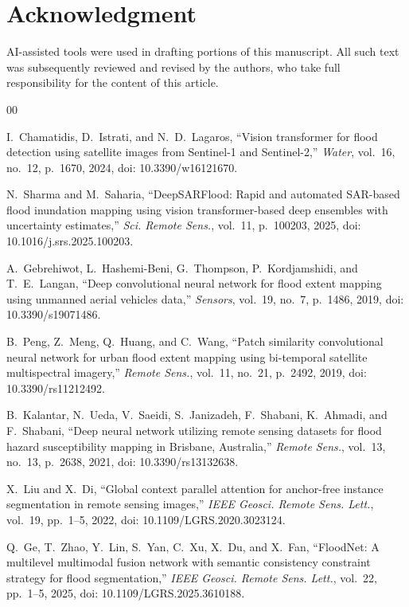 \section*{Acknowledgment}

AI-assisted tools were used in drafting portions of this manuscript. All such
text was subsequently reviewed and revised by the authors, who take full
responsibility for the content of this article.

\begin{thebibliography}{00}

 I.~Chamatidis, D.~Istrati, and N.~D.~Lagaros, ``Vision transformer
for flood detection using satellite images from Sentinel-1 and Sentinel-2,''
\emph{Water}, vol.~16, no.~12, p.~1670, 2024, doi: 10.3390/w16121670.

 N.~Sharma and M.~Saharia, ``DeepSARFlood: Rapid and automated
SAR-based flood inundation mapping using vision transformer-based deep ensembles
with uncertainty estimates,'' \emph{Sci. Remote Sens.}, vol.~11, p.~100203,
2025, doi: 10.1016/j.srs.2025.100203.

 A.~Gebrehiwot, L.~Hashemi-Beni, G.~Thompson, P.~Kordjamshidi, and
T.~E.~Langan, ``Deep convolutional neural network for flood extent mapping using
unmanned aerial vehicles data,'' \emph{Sensors}, vol.~19, no.~7, p.~1486, 2019,
doi: 10.3390/s19071486.

 B.~Peng, Z.~Meng, Q.~Huang, and C.~Wang, ``Patch similarity
convolutional neural network for urban flood extent mapping using bi-temporal
satellite multispectral imagery,'' \emph{Remote Sens.}, vol.~11, no.~21, p.~2492,
2019, doi: 10.3390/rs11212492.

 B.~Kalantar, N.~Ueda, V.~Saeidi, S.~Janizadeh, F.~Shabani,
K.~Ahmadi, and F.~Shabani, ``Deep neural network utilizing remote sensing
datasets for flood hazard susceptibility mapping in Brisbane, Australia,''
\emph{Remote Sens.}, vol.~13, no.~13, p.~2638, 2021, doi: 10.3390/rs13132638.

 X.~Liu and X.~Di, ``Global context parallel attention for anchor-free
instance segmentation in remote sensing images,'' \emph{IEEE Geosci. Remote Sens.
Lett.}, vol.~19, pp.~1--5, 2022, doi: 10.1109/LGRS.2020.3023124.

 Q.~Ge, T.~Zhao, Y.~Lin, S.~Yan, C.~Xu, X.~Du, and X.~Fan, ``FloodNet:
A multilevel multimodal fusion network with semantic consistency constraint
strategy for flood segmentation,'' \emph{IEEE Geosci. Remote Sens. Lett.},
vol.~22, pp.~1--5, 2025, doi: 10.1109/LGRS.2025.3610188.


\end{thebibliography}
